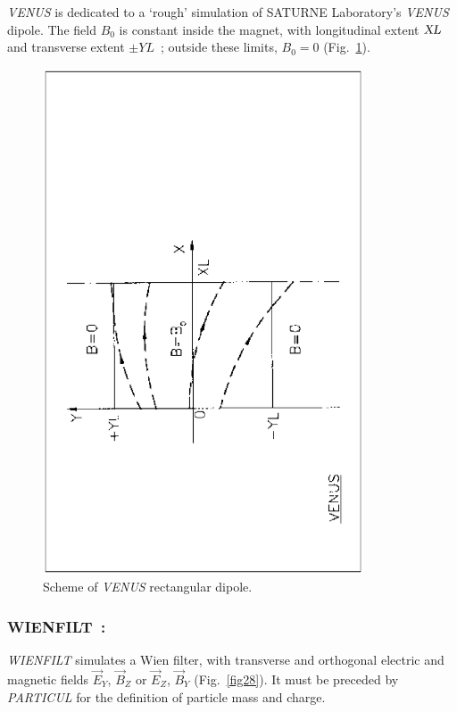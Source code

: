 \textsl{VENUS} is dedicated to a `rough' simulation
of SATURNE Laboratory's  \textsl{VENUS} 
dipole.  The field $ B_0 $ is constant inside the magnet, with longitudinal 
extent $ \textsl{XL} $ and transverse extent $ \pm YL $~;  outside these limits, $ B_0=0$ 
(Fig.~\ref{fig32}).  

\vfill
\begin{figure}[H]
\centerline{\includegraphics[height=15cm,angle=-90]{Fig32.ps}}
\caption{\label{fig32}Scheme of \textsl{VENUS} rectangular dipole.}
\end{figure}
\vfill

\newpage

\subsubsection*{WIENFILT~: \WIENFILTTitl}\label{WIENFILT} 
\medskip 

\textsl{WIENFILT} simulates a Wien filter, with transverse and
orthogonal electric and magnetic fields $ \vec  E_Y$,  $ \vec  B_Z $ or $ \vec  E_Z$, 
 $ \vec  B_Y$ (Fig.~\ref{fig28}).
 It must be preceded by \textsl{PARTICUL} for the definition of particle mass and charge.  
\medskip

